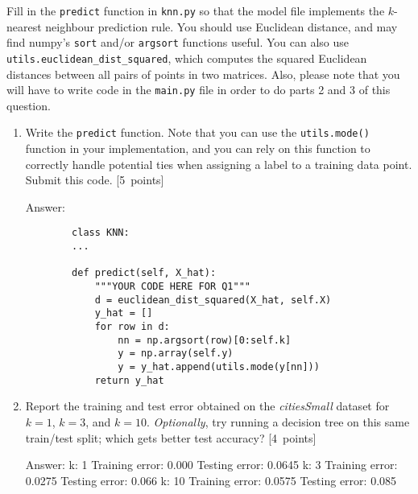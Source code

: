 \documentclass{article}
\newcommand{\blu}[1]{{\textcolor{blu}{#1}}}
\newcommand{\gre}[1]{\textcolor{gre}{#1}}
\newcommand\ans[1]{\par\gre{Answer: #1}}
\let\ask\blu
\newcommand\pts[1]{\textcolor{pointscolour}{[#1~points]}}
\begin{document}
    Fill in the \texttt{predict} function in \texttt{knn.py} so that the model file implements the $k$-nearest neighbour prediction rule.
    You should use Euclidean distance, and may find numpy's \texttt{sort} and/or \texttt{argsort} functions useful.
    You can also use \texttt{utils.euclidean\string_dist\string_squared}, which computes the squared Euclidean distances between all pairs of points in two matrices. Also, please note that you will have to write code in the \texttt{main.py} file in order to do parts 2 and 3 of this question.
    \begin{enumerate}
        \item Write the \texttt{predict} function. Note that you can use the \texttt{utils.mode()} function in your implementation, and you can rely on this function to correctly handle potential ties when assigning a label to a training data point. \ask{Submit this code.} \pts{5}
        \ans{}
        \begin{verbatim}
        class KNN:
        ...
    
        def predict(self, X_hat):
            """YOUR CODE HERE FOR Q1"""
            d = euclidean_dist_squared(X_hat, self.X)
            y_hat = []
            for row in d:
                nn = np.argsort(row)[0:self.k]
                y = np.array(self.y)
                y = y_hat.append(utils.mode(y[nn]))
            return y_hat
         \end{verbatim}
         \newpage
         
        \item \ask{Report the training and test error} obtained on the \emph{citiesSmall} dataset for $k=1$, $k=3$, and $k=10$. \emph{Optionally}, try running a decision tree on this same train/test split; which gets better test accuracy? \pts{4}
        
        \ans{\newline k: 1 \newline Training error: 0.000 \newline Testing error: 0.0645 \newline\newline k: 3 \newline Training error: 0.0275 \newline Testing error: 0.066 \newline\newline k: 10 \newline Training error: 0.0575 \newline Testing error: 0.085}
        

\end{enumerate}
\end{document}
